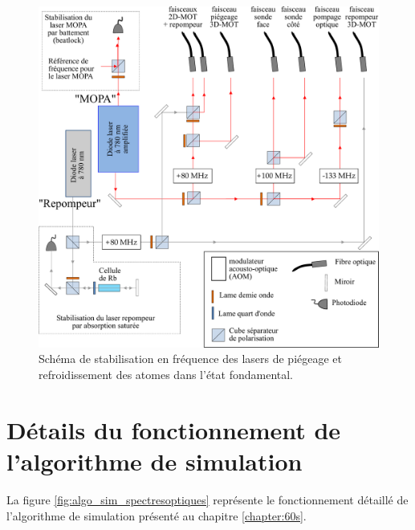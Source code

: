 \documentclass[11pt,a4paper,twoside]{book}
\begin{document}
\begin{figure}[h]
\centering
\includegraphics[width=\linewidth]{figures/apx/stabil_laser_2}
\caption[Schéma de stabilisation en fréquence des lasers de piégeage et refroidissement]
{
Schéma de stabilisation en fréquence des lasers de piégeage et refroidissement des atomes dans l'état fondamental.
}
\label{fig:laserlock2}
\end{figure}

\chapter{Détails du fonctionnement de l'algorithme de simulation}\label{app:algo}

\noindent La figure \eqref{fig:algo_sim_spectresoptiques} représente le fonctionnement détaillé de l'algorithme de simulation présenté au chapitre \ref{chapter:60s}.
\end{document}
